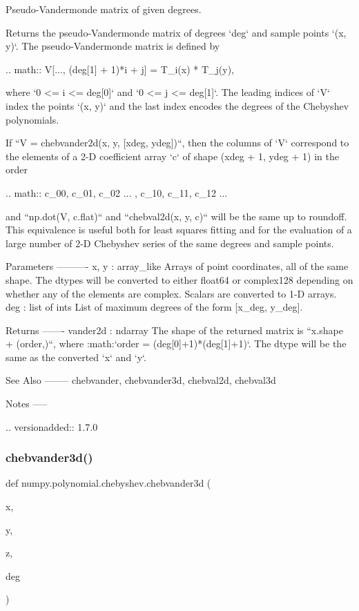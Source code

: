 \begin{DoxyVerb}Pseudo-Vandermonde matrix of given degrees.

Returns the pseudo-Vandermonde matrix of degrees `deg` and sample
points `(x, y)`. The pseudo-Vandermonde matrix is defined by

.. math:: V[..., (deg[1] + 1)*i + j] = T_i(x) * T_j(y),

where `0 <= i <= deg[0]` and `0 <= j <= deg[1]`. The leading indices of
`V` index the points `(x, y)` and the last index encodes the degrees of
the Chebyshev polynomials.

If ``V = chebvander2d(x, y, [xdeg, ydeg])``, then the columns of `V`
correspond to the elements of a 2-D coefficient array `c` of shape
(xdeg + 1, ydeg + 1) in the order

.. math:: c_{00}, c_{01}, c_{02} ... , c_{10}, c_{11}, c_{12} ...

and ``np.dot(V, c.flat)`` and ``chebval2d(x, y, c)`` will be the same
up to roundoff. This equivalence is useful both for least squares
fitting and for the evaluation of a large number of 2-D Chebyshev
series of the same degrees and sample points.

Parameters
----------
x, y : array_like
    Arrays of point coordinates, all of the same shape. The dtypes
    will be converted to either float64 or complex128 depending on
    whether any of the elements are complex. Scalars are converted to
    1-D arrays.
deg : list of ints
    List of maximum degrees of the form [x_deg, y_deg].

Returns
-------
vander2d : ndarray
    The shape of the returned matrix is ``x.shape + (order,)``, where
    :math:`order = (deg[0]+1)*(deg[1]+1)`.  The dtype will be the same
    as the converted `x` and `y`.

See Also
--------
chebvander, chebvander3d, chebval2d, chebval3d

Notes
-----

.. versionadded:: 1.7.0\end{DoxyVerb}
 \mbox{\label{namespacenumpy_1_1polynomial_1_1chebyshev_ad1cc7eced1767129b617b3461bc0752a}} 
\subsubsection{\texorpdfstring{chebvander3d()}{chebvander3d()}}
{\footnotesize\ttfamily def numpy.\+polynomial.\+chebyshev.\+chebvander3d (\begin{DoxyParamCaption}\item[{}]{x,  }\item[{}]{y,  }\item[{}]{z,  }\item[{}]{deg }\end{DoxyParamCaption})}

